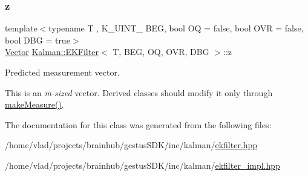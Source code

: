\subsubsection{\texorpdfstring{z}{z}}
{\footnotesize\ttfamily template$<$typename T , K\+\_\+\+U\+I\+N\+T\+\_ B\+EG, bool OQ = false, bool O\+VR = false, bool D\+BG = true$>$ \\
\mbox{\hyperlink{classKalman_1_1EKFilter_af773d1217ecb01925b857d49b32bc636}{Vector}} \mbox{\hyperlink{classKalman_1_1EKFilter}{Kalman\+::\+E\+K\+Filter}}$<$ T, B\+EG, OQ, O\+VR, D\+BG $>$\+::z\hspace{0.3cm}{\ttfamily [protected]}}



Predicted measurement vector. 

This is an {\itshape m-\/sized} vector. Derived classes should modify it only through {\ttfamily \mbox{\hyperlink{classKalman_1_1EKFilter_aac9f6d80e5ec9e6ea2ccf045cb682df8}{make\+Measure()}}}. 

The documentation for this class was generated from the following files\+:\begin{DoxyCompactItemize}
\item 
/home/vlad/projects/brainhub/gestus\+S\+D\+K/inc/kalman/\mbox{\hyperlink{ekfilter_8hpp}{ekfilter.\+hpp}}\item 
/home/vlad/projects/brainhub/gestus\+S\+D\+K/inc/kalman/\mbox{\hyperlink{ekfilter__impl_8hpp}{ekfilter\+\_\+impl.\+hpp}}\end{DoxyCompactItemize}
